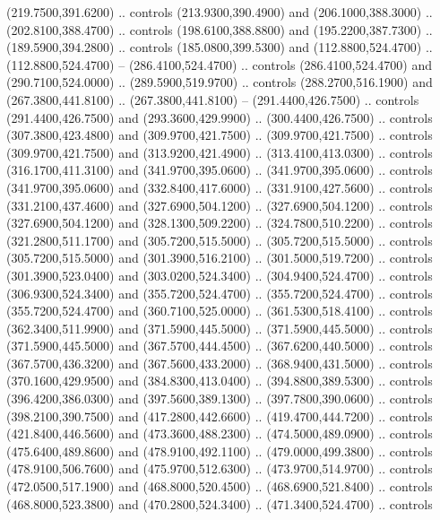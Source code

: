 {{{{{            (219.7500,391.6200) .. controls (213.9300,390.4900) and (206.1000,388.3000) ..
            (202.8100,388.4700) .. controls (198.6100,388.8800) and (195.2200,387.7300) ..
            (189.5900,394.2800) .. controls (185.0800,399.5300) and (112.8800,524.4700) ..
            (112.8800,524.4700) -- (286.4100,524.4700) .. controls (286.4100,524.4700) and
            (290.7100,524.0000) .. (289.5900,519.9700) .. controls (288.2700,516.1900) and
            (267.3800,441.8100) .. (267.3800,441.8100) -- (291.4400,426.7500) .. controls
            (291.4400,426.7500) and (293.3600,429.9900) .. (300.4400,426.7500) .. controls
            (307.3800,423.4800) and (309.9700,421.7500) .. (309.9700,421.7500) .. controls
            (309.9700,421.7500) and (313.9200,421.4900) .. (313.4100,413.0300) .. controls
            (316.1700,411.3100) and (341.9700,395.0600) .. (341.9700,395.0600) .. controls
            (341.9700,395.0600) and (332.8400,417.6000) .. (331.9100,427.5600) .. controls
            (331.2100,437.4600) and (327.6900,504.1200) .. (327.6900,504.1200) .. controls
            (327.6900,504.1200) and (328.1300,509.2200) .. (324.7800,510.2200) .. controls
            (321.2800,511.1700) and (305.7200,515.5000) .. (305.7200,515.5000) .. controls
            (305.7200,515.5000) and (301.3900,516.2100) .. (301.5000,519.7200) .. controls
            (301.3900,523.0400) and (303.0200,524.3400) .. (304.9400,524.4700) .. controls
            (306.9300,524.3400) and (355.7200,524.4700) .. (355.7200,524.4700) .. controls
            (355.7200,524.4700) and (360.7100,525.0000) .. (361.5300,518.4100) .. controls
            (362.3400,511.9900) and (371.5900,445.5000) .. (371.5900,445.5000) .. controls
            (371.5900,445.5000) and (367.5700,444.4500) .. (367.6200,440.5000) .. controls
            (367.5700,436.3200) and (367.5600,433.2000) .. (368.9400,431.5000) .. controls
            (370.1600,429.9500) and (384.8300,413.0400) .. (394.8800,389.5300) .. controls
            (396.4200,386.0300) and (397.5600,389.1300) .. (397.7800,390.0600) .. controls
            (398.2100,390.7500) and (417.2800,442.6600) .. (419.4700,444.7200) .. controls
            (421.8400,446.5600) and (473.3600,488.2300) .. (474.5000,489.0900) .. controls
            (475.6400,489.8600) and (478.9100,492.1100) .. (479.0000,499.3800) .. controls
            (478.9100,506.7600) and (475.9700,512.6300) .. (473.9700,514.9700) .. controls
            (472.0500,517.1900) and (468.8000,520.4500) .. (468.6900,521.8400) .. controls
            (468.8000,523.3800) and (470.2800,524.3400) .. (471.3400,524.4700) .. controls
}}}}}
